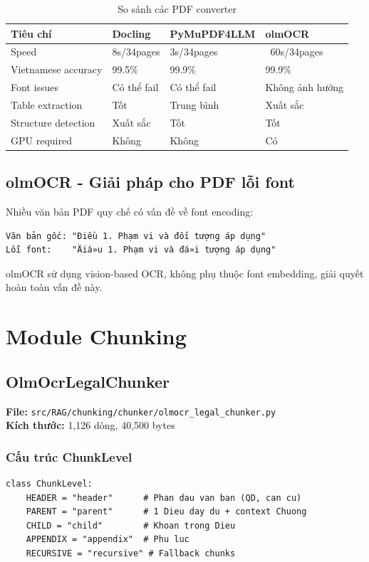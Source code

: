 \documentclass[../DoAn.tex]{subfiles}
\begin{document}
\begin{table}[h]
\centering
\begin{tabular}{|l|l|l|l|}
\hline
\textbf{Tiêu chí} & \textbf{Docling} & \textbf{PyMuPDF4LLM} & \textbf{olmOCR} \\
\hline
Speed & 8s/34pages & 3s/34pages & ~60s/34pages \\
\hline
Vietnamese accuracy & 99.5\% & 99.9\% & 99.9\% \\
\hline
Font issues & Có thể fail & Có thể fail & Không ảnh hưởng \\
\hline
Table extraction & Tốt & Trung bình & Xuất sắc \\
\hline
Structure detection & Xuất sắc & Tốt & Tốt \\
\hline
GPU required & Không & Không & Có \\
\hline
\end{tabular}
\caption{So sánh các PDF converter}
\end{table}

\subsection{olmOCR - Giải pháp cho PDF lỗi font}
Nhiều văn bản PDF quy chế có vấn đề về font encoding:

\begin{verbatim}
Văn bản gốc: "Điều 1. Phạm vi và đối tượng áp dụng"
Lỗi font:    "Äiá»u 1. Phạm vi và đá»i tượng áp dụng"
\end{verbatim}

olmOCR sử dụng vision-based OCR, không phụ thuộc font embedding, giải quyết hoàn toàn vấn đề này.

\section{Module Chunking}

\subsection{OlmOcrLegalChunker}
\textbf{File:} \texttt{src/RAG/chunking/chunker/olmocr\_legal\_chunker.py}\\
\textbf{Kích thước:} 1,126 dòng, 40,500 bytes

\subsubsection{Cấu trúc ChunkLevel}
\begin{verbatim}
class ChunkLevel:
    HEADER = "header"      # Phan dau van ban (QD, can cu)
    PARENT = "parent"      # 1 Dieu day du + context Chuong
    CHILD = "child"        # Khoan trong Dieu
    APPENDIX = "appendix"  # Phu luc
    RECURSIVE = "recursive" # Fallback chunks
\end{verbatim}
\end{document}
